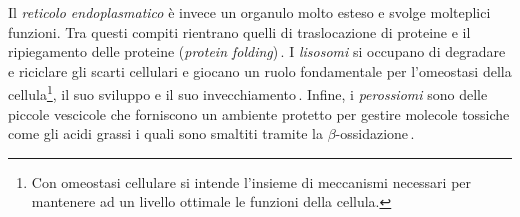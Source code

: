 Il \textsl{reticolo endoplasmatico} è invece un organulo molto esteso e svolge molteplici funzioni. Tra questi compiti rientrano quelli di traslocazione di proteine e il ripiegamento delle proteine (\textsl{protein folding})\,\cite{alberts2015essential, voeltz2002structural}. I \textsl{lisosomi} si occupano di degradare e riciclare gli scarti cellulari e giocano un ruolo fondamentale per l'omeostasi della cellula\footnote{Con omeostasi cellulare si intende l'insieme di meccanismi necessari per mantenere ad un livello ottimale le funzioni della cellula.}, il suo sviluppo e il suo invecchiamento\,\cite{ballabio2016awesome, yang2021lysosome, dell2000lysosome}. Infine, i \textsl{perossiomi} sono delle piccole vescicole che forniscono un ambiente protetto per gestire molecole tossiche come gli acidi grassi i quali sono smaltiti tramite la $\beta$-ossidazione\,\cite{alberts2015essential, islinger2012peroxisome}.

